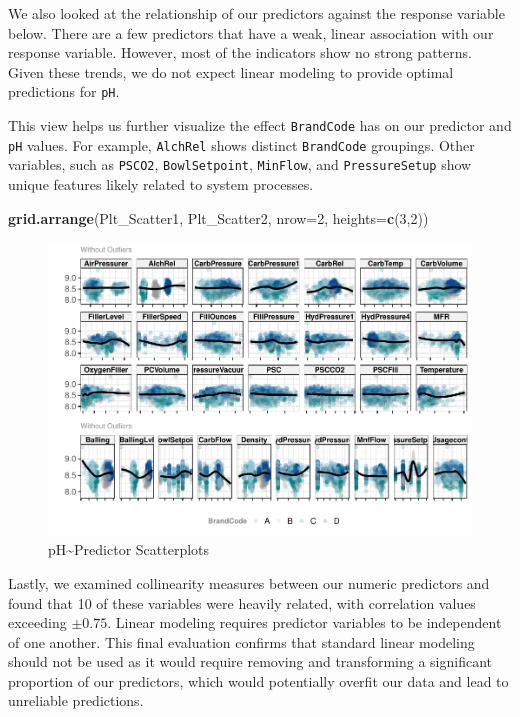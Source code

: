 \documentclass[]{report}
\newenvironment{Shaded}{\begin{snugshade}}{\end{snugshade}}
\newcommand{\DataTypeTok}[1]{\textcolor[rgb]{0.13,0.29,0.53}{#1}}
\newcommand{\DecValTok}[1]{\textcolor[rgb]{0.00,0.00,0.81}{#1}}
\newcommand{\KeywordTok}[1]{\textcolor[rgb]{0.13,0.29,0.53}{\textbf{#1}}}
\newcommand{\NormalTok}[1]{#1}
\begin{document}
We also looked at the relationship of our predictors against the
response variable below. There are a few predictors that have a weak,
linear association with our response variable. However, most of the
indicators show no strong patterns. Given these trends, we do not expect
linear modeling to provide optimal predictions for \texttt{pH}.

This view helps us further visualize the effect \texttt{BrandCode} has
on our predictor and \texttt{pH} values. For example, \texttt{AlchRel}
shows distinct \texttt{BrandCode} groupings. Other variables, such as
\texttt{PSCO2}, \texttt{BowlSetpoint}, \texttt{MinFlow}, and
\texttt{PressureSetup} show unique features likely related to system
processes.

\begin{Shaded}
\begin{Highlighting}[]
\KeywordTok{grid.arrange}\NormalTok{(Plt_Scatter1, Plt_Scatter2, }\DataTypeTok{nrow=}\DecValTok{2}\NormalTok{, }\DataTypeTok{heights=}\KeywordTok{c}\NormalTok{(}\DecValTok{3}\NormalTok{,}\DecValTok{2}\NormalTok{))}
\end{Highlighting}
\end{Shaded}

\begin{figure}
\centering
\includegraphics{Proj2-JM_files/figure-latex/unnamed-chunk-4-1.pdf}
\caption{pH\textasciitilde{}Predictor Scatterplots}
\end{figure}

Lastly, we examined collinearity measures between our numeric predictors
and found that 10 of these variables were heavily related, with
correlation values exceeding \(\pm{0.75}\). Linear modeling requires
predictor variables to be independent of one another. This final
evaluation confirms that standard linear modeling should not be used as
it would require removing and transforming a significant proportion of
our predictors, which would potentially overfit our data and lead to
unreliable predictions.
\end{document}
